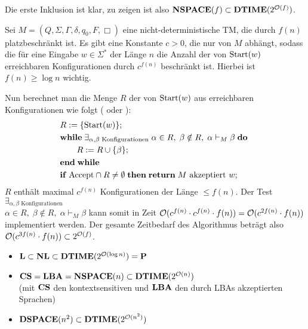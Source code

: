 \begin{Beweis}
    Die erste Inklusion ist klar, zu zeigen ist also $\mathbf{NSPACE}(f) \subset \mathbf{DTIME}(2^{\mathcal{O}(f)})$.

    Sei $M = (Q, \Sigma, \Gamma, \delta, q_0, F, \Box)$ eine nicht-deterministische TM,
    die durch $f(n)$ platzbeschränkt ist.
    Es gibt eine Konstante $c > 0$, die nur von $M$ abhängt, sodass
    die für eine Eingabe $w \in \Sigma^\ast$ der Länge $n$ die Anzahl der von $\text{Start}(w)$
    erreichbaren Konfigurationen durch $c^{f(n)}$ beschränkt ist.
    Hierbei ist $f(n) \ge \log n$ wichtig.

    Nun berechnet man die Menge $R$ der von $\text{Start}(w)$ aus erreichbaren Konfigurationen wie folgt
    ( oder ):
    \begin{align*}
        &R := \{\text{Start}(w)\};\\
        &\mathbf{while}\; \exists_{\alpha, \beta \text{ Konfigurationen}}\; \alpha \in R,\; \beta \notin R,\;
        \alpha \vdash_M \beta \;\mathbf{do}\;\\
        &\qquad R := R \cup \{\beta\};\\
        &\mathbf{end}\;\mathbf{while}\;\\
        &\mathbf{if}\; \text{Accept} \cap R \not= \emptyset \;\mathbf{then}\; \mathbf{return}\; M \text{ akzeptiert } w;
    \end{align*}
    $R$ enthält maximal $c^{f(n)}$ Konfigurationen der Länge $\le f(n)$.
    Der Test $\exists_{\alpha, \beta \text{ Konfigurationen}}$\\
    $\alpha \in R,\; \beta \notin R,\; \alpha \vdash_M \beta$ kann somit in Zeit
    $\mathcal{O}(c^{f(n)} \cdot c^{f(n)} \cdot f(n)) = \mathcal{O}(c^{2f(n)} \cdot f(n))$
    implementiert werden.
    Der gesamte Zeitbedarf des Algorithmus beträgt also
    $\mathcal{O}(c^{3f(n)} \cdot f(n)) \subset 2^{\mathcal{O}(f)}$.
\end{Beweis}

\linie

\begin{Kor}
    \begin{itemize}
        \item
        $\mathbf{L} \subset \mathbf{NL} \subset \mathbf{DTIME}(2^{\mathcal{O}(\log n)}) = \mathbf{P}$

        \item
        $\mathbf{CS} = \mathbf{LBA} = \mathbf{NSPACE}(n) \subset \mathbf{DTIME}(2^{\mathcal{O}(n)})$\\
        (mit $\mathbf{CS}$ den kontextsensitiven und $\mathbf{LBA}$ den durch LBAs akzeptierten Sprachen)

        \item
        $\mathbf{DSPACE}(n^2) \subset \mathbf{DTIME}(2^{\mathcal{O}(n^2)})$
    \end{itemize}
\end{Kor}

